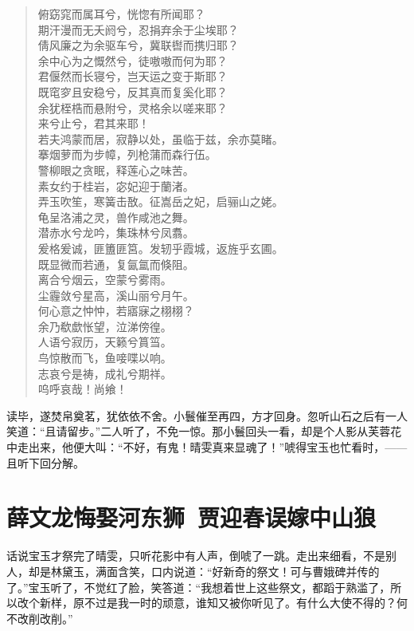 \documentclass[12pt,oneside]{book}
\newenvironment{shici}{%
\begin{verse}%
\centering\large\hspace{12pt}}%
{\end{verse}}
\begin{document}
\begin{shici}
俯窈窕而属耳兮，恍惚有所闻耶？\\
期汗漫而无夭阏兮，忍捐弃余于尘埃耶？\\
倩风廉之为余驱车兮，冀联辔而携归耶？\\
余中心为之慨然兮，徒嗷嗷而何为耶？\\
君偃然而长寝兮，岂天运之变于斯耶？\\
既窀穸且安稳兮，反其真而复奚化耶？\\
余犹桎梏而悬附兮，灵格余以嗟来耶？\\
来兮止兮，君其来耶！\\
若夫鸿蒙而居，寂静以处，虽临于兹，余亦莫睹。\\
搴烟萝而为步幛，列枪蒲而森行伍。\\
警柳眼之贪眠，释莲心之味苦。\\
素女约于桂岩，宓妃迎于蘭渚。\\
弄玉吹笙，寒簧击敔。征嵩岳之妃，启骊山之姥。\\
龟呈洛浦之灵，兽作咸池之舞。\\
潜赤水兮龙吟，集珠林兮凤翥。\\
爰格爰诚，匪簠匪筥。发轫乎霞城，返旌乎玄圃。\\
既显微而若通，复氤氲而倏阻。\\
离合兮烟云，空蒙兮雾雨。\\
尘霾敛兮星高，溪山丽兮月午。\\
何心意之忡忡，若寤寐之栩栩？\\
余乃欷歔怅望，泣涕傍徨。\\
人语兮寂历，天籁兮篔筜。\\
鸟惊散而飞，鱼唼喋以响。\\
志哀兮是祷，成礼兮期祥。\\
呜呼哀哉！尚飨！
\end{shici}

读毕，遂焚帛奠茗，犹依依不舍。小鬟催至再四，方才回身。忽听山石之后有一人笑道：“且请留步。”二人听了，不免一惊。那小鬟回头一看，却是个人影从芙蓉花中走出来，他便大叫：“不好，有鬼！晴雯真来显魂了！”唬得宝玉也忙看时，——且听下回分解。
 
 
\chapter{薛文龙悔娶河东狮~贾迎春误嫁中山狼}
话说宝玉才祭完了晴雯，只听花影中有人声，倒唬了一跳。走出来细看，不是别人，却是林黛玉，满面含笑，口内说道：“好新奇的祭文！可与曹娥碑并传的了。”宝玉听了，不觉红了脸，笑答道：“我想着世上这些祭文，都蹈于熟滥了，所以改个新样，原不过是我一时的顽意，谁知又被你听见了。有什么大使不得的？何不改削改削。”
\end{document}
